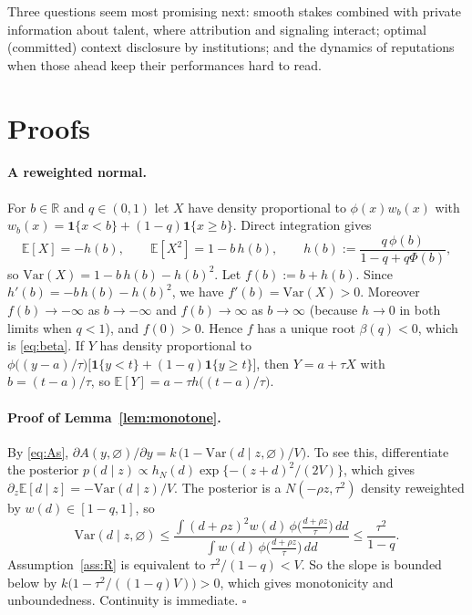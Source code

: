 \documentclass[11pt]{article}
\theoremstyle{definition}
\newcommand{\E}{\mathbb{E}}
\newcommand{\Var}{\mathrm{Var}}
\newcommand{\R}{\mathbb{R}}
\newcommand{\sil}{\varnothing}
\begin{document}
Three questions seem most promising next: smooth stakes combined with private information about talent, where attribution and signaling interact; optimal (committed) context disclosure by institutions; and the dynamics of reputations when those ahead keep their performances hard to read.




\appendix
\section{Proofs}\label{app:proofs}

\paragraph{A reweighted normal.} For $b\in\R$ and $q\in(0,1)$ let $X$ have density proportional to $\phi(x)w_b(x)$ with $w_b(x)=\mathbf 1\{x<b\}+(1-q)\mathbf 1\{x\ge b\}$. Direct integration gives
\[
\E[X]=-h(b),\qquad \E[X^2]=1-b\,h(b),\qquad h(b):=\frac{q\,\phi(b)}{1-q+q\Phi(b)} ,
\]
so $\Var(X)=1-b\,h(b)-h(b)^2$. Let $f(b):=b+h(b)$. Since $h'(b)=-b\,h(b)-h(b)^2$, we have $f'(b)=\Var(X)>0$. Moreover $f(b)\to-\infty$ as $b\to-\infty$ and $f(b)\to\infty$ as $b\to\infty$ (because $h\to0$ in both limits when $q<1$), and $f(0)>0$. Hence $f$ has a unique root $\beta(q)<0$, which is \eqref{eq:beta}. If $Y$ has density proportional to $\phi\big((y-a)/\tau\big)\big[\mathbf 1\{y<t\}+(1-q)\mathbf 1\{y\ge t\}\big]$, then $Y=a+\tau X$ with $b=(t-a)/\tau$, so $\E[Y]=a-\tau h\big((t-a)/\tau\big)$.

\paragraph{Proof of Lemma~\ref{lem:monotone}.} By \eqref{eq:As}, $\partial A(y,\sil)/\partial y=k\,\big(1-\Var(d\mid z,\sil)/V\big)$. To see this, differentiate the posterior $p(d\mid z)\propto h_N(d)\exp\{-(z+d)^2/(2V)\}$, which gives $\partial_z\E[d\mid z]=-\Var(d\mid z)/V$. The posterior is a $N(-\rho z,\tau^2)$ density reweighted by $w(d)\in[1-q,1]$, so
\[
\Var(d\mid z,\sil)\le \frac{\int (d+\rho z)^2 w(d)\,\phi\big(\tfrac{d+\rho z}{\tau}\big)\,dd}{\int w(d)\,\phi\big(\tfrac{d+\rho z}{\tau}\big)\,dd}\le\frac{\tau^2}{1-q}.
\]
Assumption~\ref{ass:R} is equivalent to $\tau^2/(1-q)<V$. So the slope is bounded below by $k\big(1-\tau^2/((1-q)V)\big)>0$, which gives monotonicity and unboundedness. Continuity is immediate. \hfill$\square$
\end{document}

